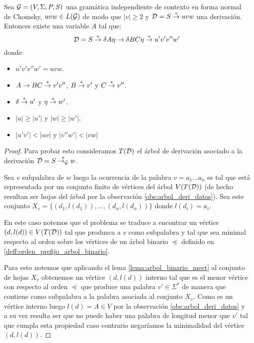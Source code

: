 \documentclass[tesis.tex]{subfiles}
\begin{document}
	\begin{lema}\label{lema:gram_ic_chomsky_variable_chica_deriva}
		Sea ${\cal G} = (V, \Sigma, P, S)$ una gramática independiente de contexto en forma normal de Chomsky, $uvw \in L({\cal G})$ de modo que $|v| \ge 2$ y ${\cal D} = S \overset{*}{\to} uvw$ una derivación. 
		Entonces existe una variable $A$ tal que:
		\[
				{\cal D} = S \overset{*}{\to} \delta A \eta \to \delta BC \eta \overset{*}{\to} u'v'v''w'
		\]
			donde:
			\begin{itemize}
				\item $u'v'v''w' = uvw$. 
				\item $A \to BC \overset{*}{\to} v'v''$, $B \overset{*}{\to} v'$ y $C \overset{*}{\to} v''$. 
				\item $\delta \overset{*}{\to} u'$ y $\eta \overset{*}{\to} w'$. 
				\item $|u| \ge |u'|$ y $|w| \ge |w'|$. 
				\item $|u'v'| < |uv|$ y $|v''w'| < |vw|$
			\end{itemize}
	\end{lema}
	\begin{proof}
		Para probar esto consideramos $T({\cal D})$ el árbol de derivación asociado a la derivación ${\cal D} = S \overset{*}{\to_{\cal G}} w$.

		Sea $v$ subpalabra de $w$ luego la ocurrencia de la palabra 
		$v = a_{1} \dots a_{n}$ es tal que está representada por un conjunto finito de vértices del árbol $V(T({\cal D}))$ (de hecho resultan ser hojas del árbol por la observación \ref{obs:arbol_deri_datos}).
		Sea este conjunto $X_{v}  = \{ (d_{1},l(d_{1})), \dots, (d_{n},l(d_{n})) \}$ donde $l(d_{i}) = a_{i}$.

		En este caso notemos que el problema se traduce a encontrar un vértice $(d,l(d)) \in V(T({\cal D}))$ tal que produzca a $v$ como subpalabra y tal que sea minimal respecto al orden sobre los vértices de un árbol binario $\preceq$ definido en \ref{deff:orden_prefijo_arbol_binario}. 
		

		Para esto notemos que aplicando el lema \ref{lema:arbol_binario_meet} al conjunto de hojas $X_{v}$ obtenemos un vértice $(d,l(d))$ interno tal que es el menor vértice con respecto al orden $\preceq$ que produce una palabra $v' \in \Sigma^{*}$ de manera que contiene como subpalabra a la palabra asociada al conjunto $X_{v}$.
		Como es un vértice interno luego $l(d) = A \in V$ por la observación \ref{obs:arbol_deri_datos} y a su vez resulta ser que no puede haber una palabra de longitud menor que $v'$ tal que cumpla esta propiedad caso contrario negaríamos la minimalidad del vértice $(d,l(d))$.
	\end{proof}
\end{document}
